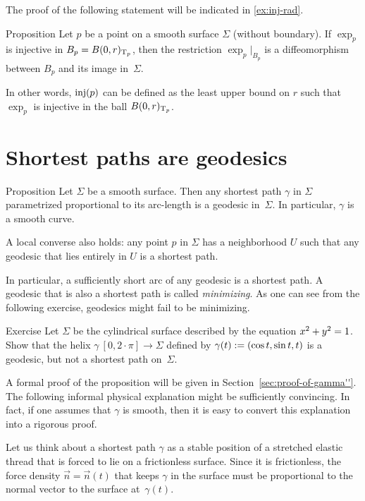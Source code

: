 The proof of the following statement will be indicated in \ref{ex:inj-rad}.

\begin{thm}{Proposition}\label{prop:inj-rad}
Let $p$ be a point on a smooth surface $\Sigma$ (without boundary).
If $\exp_p$ is injective in $B_p=B(0,r)_{\mathrm{T}_p}$, then the restriction $\exp_p|_{B_p}$ is a diffeomorphism between $B_p$ and its image in~$\Sigma$.

\end{thm}

In other words, $\mathop{\rm inj}\nolimits(p)$ can be defined as the least upper bound on $r$ such that $\exp_p$ is injective in the ball $B(0,r)_{\mathrm{T}_p}$.

\section{Shortest paths are geodesics}

\begin{thm}{Proposition}\label{prop:gamma''}
Let $\Sigma$ be a smooth surface.
Then any shortest path $\gamma$ in $\Sigma$ parametrized proportional to its arc-length is a geodesic in~$\Sigma$.
In particular, $\gamma$ is a smooth curve.

A local converse also holds: any point $p$ in $\Sigma$ has a neighborhood $U$ such that any geodesic that lies entirely in $U$ is a shortest path.
\end{thm}

In particular, a sufficiently short arc of any geodesic is a shortest path.
A geodesic that is also a shortest path is called \emph{minimizing}.
As one can see from the following exercise, geodesics might fail to be minimizing.

\begin{thm}{Exercise}\label{ex:helix=geodesic}
Let $\Sigma$ be the cylindrical surface described by the equation $x^2\z+y^2=1$.
Show that the helix $\gamma\:[0,2\cdot\pi]\to \Sigma$ defined by $\gamma(t)\z\df(\cos t,\sin t, t)$
is a geodesic, but not a shortest path on~$\Sigma$.
\end{thm}

A formal proof of the proposition will be given in Section~\ref{sec:proof-of-gamma''}.
The following informal physical explanation might be sufficiently convincing.
In fact, if one assumes that $\gamma$ is smooth, then it is easy to convert this explanation into a rigorous proof.

Let us think about a shortest path $\gamma$ as a stable position of a stretched elastic thread that is forced to lie on a frictionless surface.
Since it is frictionless, the force density $\vec n=\vec n(t)$ that keeps $\gamma$ in the surface must be proportional to the normal vector to the surface at~$\gamma(t)$.

